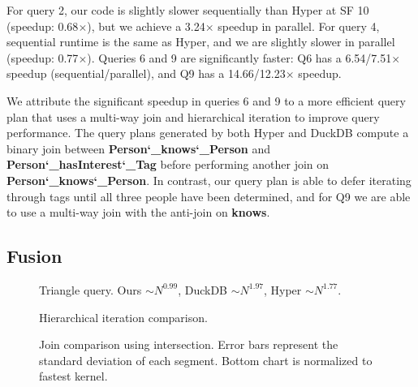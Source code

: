 \documentclass[acmsmall,screen,nonacm]{acmart}\settopmatter{printfolios=true,printccs=false,printacmref=false}
\begin{document}
For query 2, our code is slightly slower sequentially than Hyper at SF 10 (speedup: 0.68$\times$), but we achieve a 3.24$\times$ speedup in parallel. For query 4, sequential runtime is the same as Hyper, and we are slightly slower in parallel (speedup: 0.77$\times$). Queries 6 and 9 are significantly faster: Q6 has a 6.54/7.51$\times$ speedup (sequential/parallel), and Q9 has a 14.66/12.23$\times$ speedup.

We attribute the significant speedup in queries 6 and 9 to a more
efficient query plan that uses a multi-way join and hierarchical iteration
to improve query performance. The query plans generated by both Hyper and DuckDB compute a binary join between \textbf{Person\char`_knows\char`_Person} and \textbf{Person\char`_hasInterest\char`_Tag} before performing another join on \textbf{Person\char`_knows\char`_Person}. In contrast, our query plan is able to defer iterating through tags until all three people have been determined, and for Q9 we are able to use a multi-way join with the anti-join on \textbf{knows}.

\subsection{Fusion}
\label{sec:fusion}

\begin{figure}
    \begin{minipage}[b]{0.34\linewidth}\vspace{0pt}
        \centering
        \vspace{-0.3cm}\caption{Triangle query.
        Ours $\sim N^{0.99}$, DuckDB $\sim N^{1.97}$, Hyper $\sim N^{1.77}$.}
        \label{fig:tri}
        \vspace{-1em}
    \end{minipage}
    \begin{minipage}[b]{0.27\linewidth}\vspace{0pt}
        \centering
        
        \vspace{-0.3cm}\caption{Hierarchical iteration comparison.}
        \label{fig:hier}
        \vspace{-1em}
    \end{minipage}
    \begin{minipage}[b]{0.36\linewidth}\vspace{0pt}
        \centering
        
        \vspace{-0.8cm}\caption{Join comparison using intersection. Error bars represent the standard deviation of each segment. Bottom chart is normalized to fastest kernel.}
        \label{fig:inter}
        \vspace{-1em}
    \end{minipage}
    \centering
\end{figure}
\end{document}

